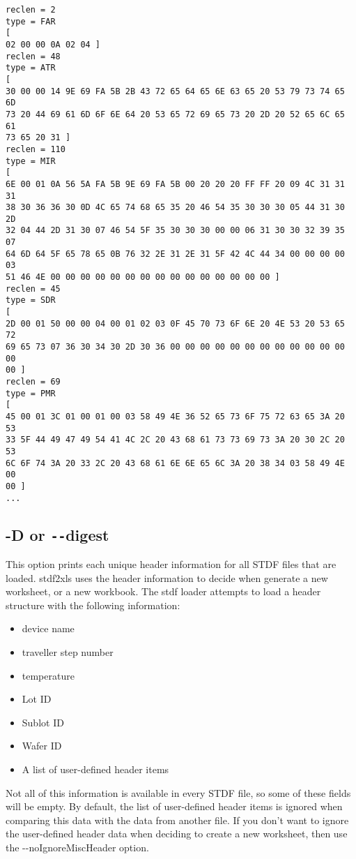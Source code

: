 \documentclass[letterpaper]{article}
\begin{document}
\begin{verbatim}
reclen = 2
type = FAR
[
02 00 00 0A 02 04 ]
reclen = 48
type = ATR
[
30 00 00 14 9E 69 FA 5B 2B 43 72 65 64 65 6E 63 65 20 53 79 73 74 65 6D
73 20 44 69 61 6D 6F 6E 64 20 53 65 72 69 65 73 20 2D 20 52 65 6C 65 61
73 65 20 31 ]
reclen = 110
type = MIR
[
6E 00 01 0A 56 5A FA 5B 9E 69 FA 5B 00 20 20 20 FF FF 20 09 4C 31 31 31
38 30 36 36 30 0D 4C 65 74 68 65 35 20 46 54 35 30 30 30 05 44 31 30 2D
32 04 44 2D 31 30 07 46 54 5F 35 30 30 30 00 00 06 31 30 30 32 39 35 07
64 6D 64 5F 65 78 65 0B 76 32 2E 31 2E 31 5F 42 4C 44 34 00 00 00 00 03
51 46 4E 00 00 00 00 00 00 00 00 00 00 00 00 00 00 00 ]
reclen = 45
type = SDR
[
2D 00 01 50 00 00 04 00 01 02 03 0F 45 70 73 6F 6E 20 4E 53 20 53 65 72
69 65 73 07 36 30 34 30 2D 30 36 00 00 00 00 00 00 00 00 00 00 00 00 00
00 ]
reclen = 69
type = PMR
[
45 00 01 3C 01 00 01 00 03 58 49 4E 36 52 65 73 6F 75 72 63 65 3A 20 53
33 5F 44 49 47 49 54 41 4C 2C 20 43 68 61 73 73 69 73 3A 20 30 2C 20 53
6C 6F 74 3A 20 33 2C 20 43 68 61 6E 6E 65 6C 3A 20 38 34 03 58 49 4E 00
00 ]
...
\end{verbatim}

\subsection{\bf -D or \texttt{-{}-}digest}
This option prints each unique header information for all STDF files that are loaded.
stdf2xls uses the header information to decide when generate a new worksheet, or a new
workbook.  The stdf loader attempts to load a header structure with the following
information:
\begin{itemize}
\item device name
\item traveller step number
\item temperature
\item Lot ID
\item Sublot ID
\item Wafer ID
\item A list of user-defined header items
\end{itemize}
Not all of this information is available in every STDF file, so some of these
fields will be empty.  By default, the list of user-defined header items
is ignored when comparing this data with the data from another file.
If you don't want to ignore the user-defined header data when deciding to
create a new worksheet, then use the -{}-noIgnoreMiscHeader option.
\end{document}
